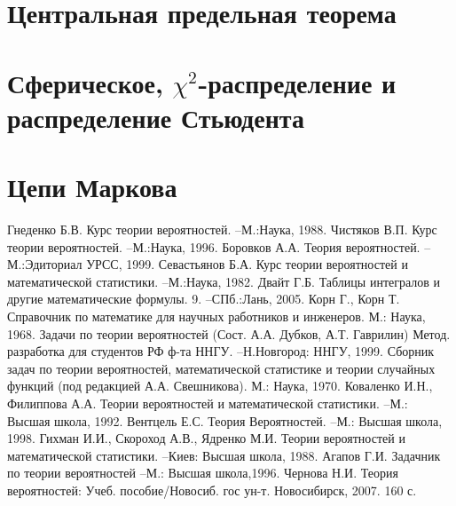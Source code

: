 \documentclass[a4paper,14pt]{extarticle}
\begin{document}
\section{Центральная предельная теорема} 

\section{Сферическое, $\chi^2$-распределение и распределение Стьюдента} 

\section{Цепи Маркова} 

\newpage
\begin{thebibliography}{12} 
	Гнеденко Б.В. Курс теории вероятностей. --М.:Наука, 1988.
	Чистяков В.П. Курс теории вероятностей. –М.:Наука, 1996.
\bibitem{}
	Боровков А.А. Теория вероятностей. – М.:Эдиториал УРСС, 1999.
	Севастьянов Б.А. Курс теории вероятностей и математической статистики. –М.:Наука, 1982.
	Двайт Г.Б. Таблицы интегралов и другие математические формулы.
	9. –СПб.:Лань, 2005.
	Корн Г., Корн Т. Справочник по математике для научных работников и инженеров. М.: Наука, 1968.
	Задачи по теории вероятностей (Сост. А.А. Дубков, А.Т. Гаврилин) Метод. разработка для студентов РФ ф-та ННГУ. –Н.Новгород: ННГУ, 1999. %
	Сборник задач по теории вероятностей, математической статистике и теории случайных функций (под редакцией А.А. Свешникова). М.: Наука, 1970.
	Коваленко И.Н., Филиппова А.А. Теории вероятностей и математической статистики. –М.: Высшая школа, 1992.
	Вентцель Е.С. Теория Вероятностей. –М.: Высшая школа, 1998.
	Гихман И.И., Скороход А.В., Ядренко М.И. Теории вероятностей и математической статистики. –Киев: Высшая школа, 1988.
	Агапов Г.И. Задачник по теории вероятностей –М.: Высшая школа,1996.
	Чернова Н.И. Теория вероятностей: Учеб. пособие/Новосиб. гос ун-т. Новосибирск, 2007. 160 с.
\end{thebibliography}
\end{document}
